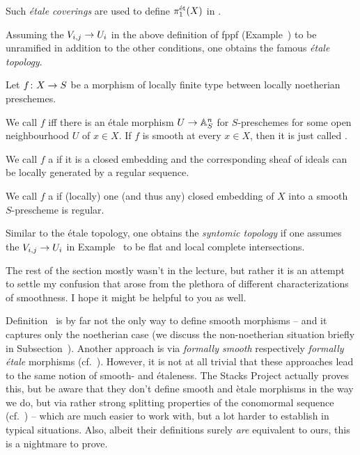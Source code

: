 \documentclass[a4paper,parskip=half,numbers=enddot, DIV=12]{scrreprt}
\begin{document}
\begin{rem}
	\begin{alphanumerate}
		\item Such \emph{étale coverings} are used to define  $\pi_1^{\mathrm{\acute{e}t}}(X)$ in \cite{sga1}.
		\item Assuming the $V_{i,j}\morphism U_i$ in the above definition of fppf (Example~) to be unramified in addition to the other conditions, one obtains the famous \emph{étale topology}.
	\end{alphanumerate}
\end{rem}
\begin{defi}
	Let $f\colon X\morphism S$ be a morphism of locally finite type between locally noetherian preschemes.
	\begin{alphanumerate}
		\item We call $f$  iff there is an étale morphism $U\morphism \IA_S^n$ for $S$-preschemes for some open neighbourhood $U$ of $x\in X$. If $f$ is smooth at every $x\in X$, then it is just called \defemph{smooth}.
		\item We call $f$ a  if it is a closed embedding and the corresponding sheaf of ideals can be locally generated by a regular sequence.
		\item We call $f$ a  if (locally) one (and thus any) closed embedding of $X$ into a smooth $S$-prescheme is regular.
	\end{alphanumerate}
\end{defi}
\begin{rem}
	Similar to the étale topology, one obtains the \emph{syntomic topology} if one assumes the $V_{i,j}\morphism U_i$ in Example~ to  be flat and local complete intersections.
\end{rem}
The rest of the section mostly wasn't in the lecture, but rather it is an attempt to settle my confusion that arose from the plethora of different characterizations of smoothness. I hope it might be helpful to you as well.

Definition~ is by far not the only way to define smooth morphisms -- and it captures only the noetherian case (we discuss the non-noetherian situation briefly in Subsection~). Another approach is via \emph{formally smooth} respectively \emph{formally étale} morphisms (cf.\ \cite[ and ]{stacks-project}). However, it is not at all trivial that these approaches lead to the same notion of smooth- and étaleness. The Stacks Project actually proves this, but be aware that they don't define smooth and ètale morphisms in the way we do, but via rather strong splitting properties of the conomormal sequence (cf.\ \cite[ and ]{stacks-project}) -- which are much easier to work with, but a lot harder to establish in typical situations. Also, albeit their definitions surely \emph{are} equivalent to ours, this is a nightmare to prove.
\end{document}
